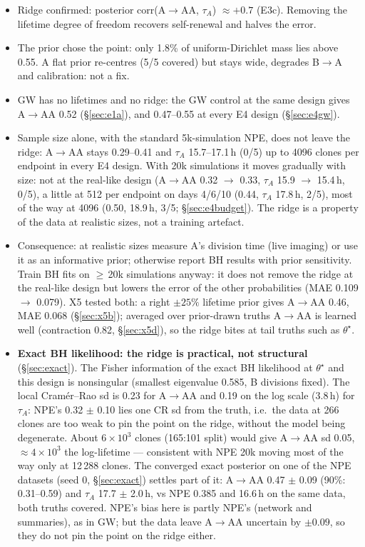 \documentclass[10pt,a4paper]{article}
\newcommand{\tA}{$\tau_A$}
\newcommand{\blk}[1]{\par\needspace{5\baselineskip}\smallskip{\sffamily\bfseries\color{inkgray}#1}\par}
\newcommand{\Comment}{\blk{Comment}}
\begin{document}
\Comment
\begin{itemize}
\item Ridge confirmed: posterior corr(A$\to$AA, \tA) $\approx +0.7$ (E3c). Removing the lifetime degree of freedom recovers self-renewal and halves the error.
\item The prior chose the point: only 1.8\% of uniform-Dirichlet mass lies above 0.55. A flat prior re-centres (5/5 covered) but stays wide, degrades B$\to$A and calibration: not a fix.
\item GW has no lifetimes and no ridge: the GW control at the same design gives A$\to$AA 0.52 (\S\ref{sec:e1a}), and 0.47--0.55 at every E4 design (\S\ref{sec:e4gw}).
\item Sample size alone, with the standard 5k-simulation NPE, does not leave the ridge: A$\to$AA stays 0.29--0.41 and \tA{} 15.7--17.1\,h (0/5) up to 4096 clones per endpoint in every E4 design. With 20k simulations it moves gradually with size: not at the real-like design (A$\to$AA 0.32 $\to$ 0.33, \tA{} 15.9 $\to$ 15.4\,h, 0/5), a little at 512 per endpoint on days 4/6/10 (0.44, \tA{} 17.8\,h, 2/5), most of the way at 4096 (0.50, 18.9\,h, 3/5; \S\ref{sec:e4budget}). The ridge is a property of the data at realistic sizes, not a training artefact.
\item Consequence: at realistic sizes measure A's division time (live imaging) or use it as an informative prior; otherwise report BH results with prior sensitivity. Train BH fits on $\ge$\,20k simulations anyway: it does not remove the ridge at the real-like design but lowers the error of the other probabilities (MAE 0.109 $\to$ 0.079). X5 tested both: a right $\pm 25\%$ lifetime prior gives A$\to$AA 0.46, MAE 0.068 (\S\ref{sec:x5b}); averaged over prior-drawn truths A$\to$AA is learned well (contraction 0.82, \S\ref{sec:x5d}), so the ridge bites at tail truths such as $\theta^\star$.
\item \textbf{Exact BH likelihood: the ridge is practical, not structural} (\S\ref{sec:exact}). The Fisher information of the exact BH likelihood at $\theta^\star$ and this design is nonsingular (smallest eigenvalue 0.585, B divisions fixed). The local Cram\'er--Rao sd is 0.23 for A$\to$AA and 0.19 on the log scale (3.8\,h) for \tA: NPE's 0.32 $\pm$ 0.10 lies one CR sd from the truth, i.e.\ the data at 266 clones are too weak to pin the point on the ridge, without the model being degenerate. About $6\times10^3$ clones (165:101 split) would give A$\to$AA sd 0.05, $\approx 4\times10^3$ the log-lifetime --- consistent with NPE 20k moving most of the way only at 12\,288 clones. The converged exact posterior on one of the NPE datasets (seed 0, \S\ref{sec:exact}) settles part of it: A$\to$AA 0.47 $\pm$ 0.09 (90\%: 0.31--0.59) and \tA{} 17.7 $\pm$ 2.0\,h, vs NPE 0.385 and 16.6\,h on the same data, both truths covered. NPE's bias here is partly NPE's (network and summaries), as in GW; but the data leave A$\to$AA uncertain by $\pm 0.09$, so they do not pin the point on the ridge either.
\end{itemize}
\end{document}
